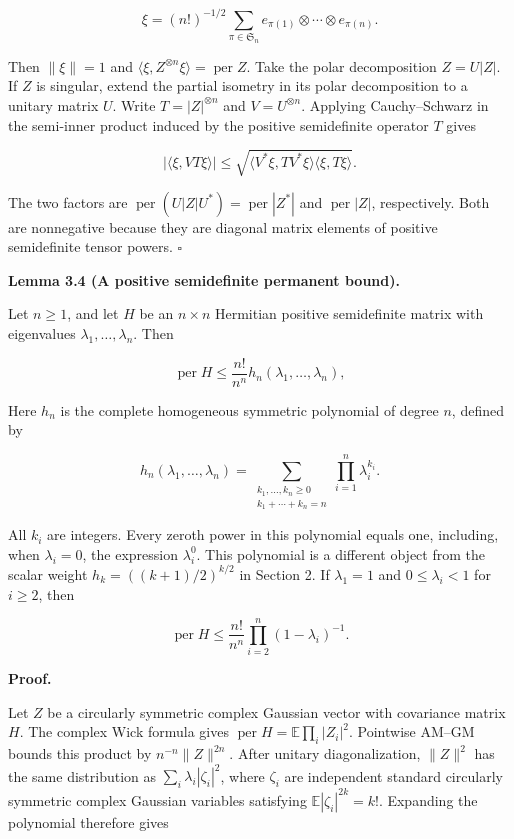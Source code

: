 \documentclass[11pt,a4paper]{article}
\begin{document}
\[
\xi=(n!)^{-1/2}
\sum_{\pi\in \mathfrak S_n}
e_{\pi(1)}\otimes\cdots\otimes e_{\pi(n)}.
\]

Then \(\|\xi\|=1\) and \(\langle\xi,Z^{\otimes n}\xi\rangle=\operatorname{per}Z\). Take the polar decomposition \(Z=U|Z|\). If \(Z\) is singular, extend the partial isometry in its polar decomposition to a unitary matrix \(U\). Write \(T=|Z|^{\otimes n}\) and \(V=U^{\otimes n}\). Applying Cauchy--Schwarz in the semi-inner product induced by the positive semidefinite operator \(T\) gives

\[
|\langle\xi,VT\xi\rangle|
\le\sqrt{\langle V^*\xi,TV^*\xi\rangle
\langle\xi,T\xi\rangle}.
\]

The two factors are \(\operatorname{per}(U|Z|U^*)=\operatorname{per}|Z^*|\) and \(\operatorname{per}|Z|\), respectively. Both are nonnegative because they are diagonal matrix elements of positive semidefinite tensor powers. \(\square\)

\textbf{Lemma 3.4 (A positive semidefinite permanent bound).}

Let \(n\ge1\), and let \(H\) be an \(n\times n\) Hermitian positive semidefinite matrix with eigenvalues \(\lambda_1,\ldots,\lambda_n\). Then

\[
\operatorname{per}H\le\frac{n!}{n^n}h_n(\lambda_1,\ldots,\lambda_n),
\]

Here \(h_n\) is the complete homogeneous symmetric polynomial of degree \(n\), defined by

\[
h_n(\lambda_1,\ldots,\lambda_n)
=\sum_{\substack{k_1,\ldots,k_n\ge0\\k_1+\cdots+k_n=n}}
\prod_{i=1}^n\lambda_i^{k_i}.
\]

All \(k_i\) are integers. Every zeroth power in this polynomial equals one, including, when \(\lambda_i=0\), the expression \(\lambda_i^0\). This polynomial is a different object from the scalar weight \(h_k=((k+1)/2)^{k/2}\) in Section 2. If \(\lambda_1=1\) and \(0\le\lambda_i<1\) for \(i\ge2\), then

\[
\operatorname{per}H\le\frac{n!}{n^n}
\prod_{i=2}^n(1-\lambda_i)^{-1}.
\]

\textbf{Proof.}

Let \(Z\) be a circularly symmetric complex Gaussian vector with covariance matrix \(H\). The complex Wick formula gives \(\operatorname{per}H=\mathbb E\prod_i|Z_i|^2\). Pointwise AM--GM bounds this product by \(n^{-n}\|Z\|^{2n}\). After unitary diagonalization, \(\|Z\|^2\) has the same distribution as \(\sum_i\lambda_i|\zeta_i|^2\), where \(\zeta_i\) are independent standard circularly symmetric complex Gaussian variables satisfying \(\mathbb E|\zeta_i|^{2k}=k!\). Expanding the polynomial therefore gives
\end{document}
